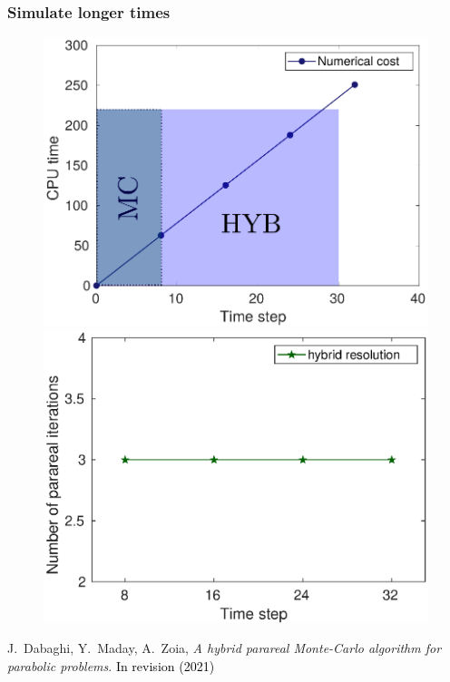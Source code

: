 \documentclass[aspectratio=169]{beamer}
\begin{document}
\begin{frame}
\frametitle{Simulate longer times}
  \begin{figure}
    \centering
\includegraphics[width = 0.48 \textwidth]{image/CPU_hyb_long_time}
\quad
\includegraphics[width = 0.48 \textwidth]{image/para_iter_hyb_long_time}
\end{figure}
\begin{thebibliography}{10}
 \scriptsize{
 {\sc J.~Dabaghi, Y.~Maday, A.~Zoia, {\em A hybrid parareal Monte-Carlo algorithm for parabolic problems}.
 \textcolor{black}{In revision (2021)}}}
 \end{thebibliography}
\end{frame}
\end{document}
